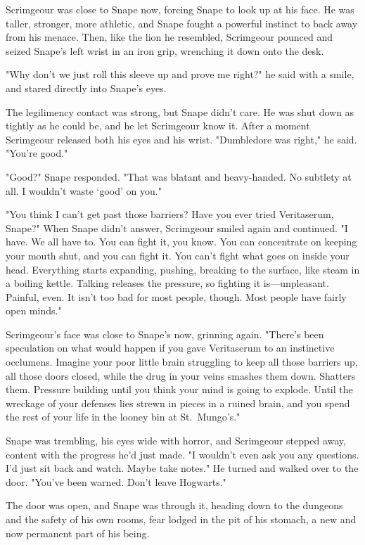 Scrimgeour was close to Snape now, forcing Snape to look up at his face. He was taller, stronger, more athletic, and Snape fought a powerful instinct to back away from his menace. Then, like the lion he resembled, Scrimgeour pounced and seized Snape's left wrist in an iron grip, wrenching it down onto the desk.

"Why don't we just roll this sleeve up and prove me right?" he said with a smile, and stared directly into Snape's eyes.

The legilimency contact was strong, but Snape didn't care. He was shut down as tightly as he could be, and he let Scrimgeour know it. After a moment Scrimgeour released both his eyes and his wrist. "Dumbledore was right," he said. "You're good."

"Good?" Snape responded. "That was blatant and heavy-handed. No subtlety at all. I wouldn't waste `good' on you."

"You think I can't get past those barriers? Have you ever tried Veritaserum, Snape?" When Snape didn't answer, Scrimgeour smiled again and continued. "I have. We all have to. You can fight it, you know. You can concentrate on keeping your mouth shut, and you can fight it. You can't fight what goes on inside your head. Everything starts expanding, pushing, breaking to the surface, like steam in a boiling kettle. Talking releases the pressure, so fighting it is—unpleasant. Painful, even. It isn't too bad for most people, though. Most people have fairly open minds."

Scrimgeour's face was close to Snape's now, grinning again. "There's been speculation on what would happen if you gave Veritaserum to an instinctive occlumens. Imagine your poor little brain struggling to keep all those barriers up, all those doors closed, while the drug in your veins smashes them down. Shatters them. Pressure building until you think your mind is going to explode. Until the wreckage of your defenses lies strewn in pieces in a ruined brain, and you spend the rest of your life in the looney bin at St.~Mungo's."

Snape was trembling, his eyes wide with horror, and Scrimgeour stepped away, content with the progress he'd just made. "I wouldn't even ask you any questions. I'd just sit back and watch. Maybe take notes." He turned and walked over to the door. "You've been warned. Don't leave Hogwarts."

The door was open, and Snape was through it, heading down to the dungeons and the safety of his own rooms, fear lodged in the pit of his stomach, a new and now permanent part of his being.

